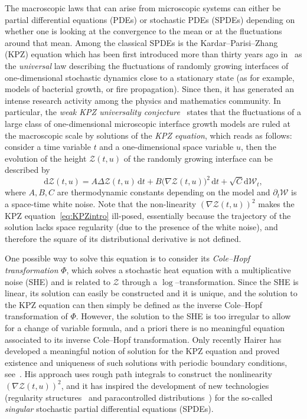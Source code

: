 \documentclass[10pt]{amsart}
\theoremstyle{definition}\newtheorem{defi}[theo]{Definition}\newtheorem{rema}[theo]{Remark}\newtheorem{exam}[theo]{Example}\newtheorem{exem}[theo]{Example}\newtheorem{nota}[theo]{Notation}
\newcommand{\mc}[1]{{\mathcal #1}}
\renewcommand{\mc}[1]{{\mathcal #1}}
\newcommand*{\dd}{\mathrm{d}}
\newcommand*{\dt}{\dd t}
\begin{document}
The macroscopic laws that can arise from microscopic systems can either be partial differential equations (PDEs) or stochastic PDEs (SPDEs) depending on whether one is looking at the convergence to the mean or at the fluctuations around that mean. Among the classical SPDEs is the Kardar--Parisi--Zhang (KPZ) equation which has been first introduced more than thirty years ago in~\cite{KPZ} as the \emph{universal} law describing the fluctuations of randomly growing interfaces of one-dimensional stochastic dynamics close to a stationary state (as for example, models of bacterial growth, or fire propagation). Since then, it has generated an intense research activity among the physics and mathematics community. In particular, the \emph{weak KPZ universality conjecture}~\cite{Corwin12, QuaS, Sp16} states that the fluctuations of a large class of one-dimensional microscopic interface growth models are ruled at the macroscopic scale by solutions of the \emph{KPZ equation}, which reads as follows: consider a time variable $t$ and a one-dimensional space variable $u$, then the evolution of the height $\mc Z(t,u)$ of the randomly growing interface can be described by
\begin{equation}
\dd\mc Z(t,u) = A \Delta \mc Z(t,u)\,\dt + B \big(\nabla \mc Z(t,u)\big)^2 \,\dt + \sqrt C \dd \mc W_t, \label{eq:KPZintro}
\end{equation}
where $A,B,C$ are thermodynamic constants depending on the model and $\partial_t\mc W$ is a space-time white noise. Note that the non-linearity $(\nabla \mc Z(t,u))^2$ makes the KPZ equation~\eqref{eq:KPZintro} ill-posed, essentially because the trajectory of the solution lacks space regularity (due to the presence of the white noise), and therefore the square of its distributional derivative is not defined.

One possible way to solve this equation is to consider its \emph{Cole--Hopf transformation} $\Phi$, which solves a stochastic heat equation with a multiplicative noise (SHE) and is related to $\mc Z$ through a $\log$--transformation. Since the SHE is linear, its solution can easily be constructed and it is unique, and the solution to the KPZ equation can then simply be defined as the inverse Cole--Hopf transformation of $\Phi$. However, the solution to the SHE is too irregular to allow for a change of variable formula, and a priori there is no meaningful equation associated to its inverse Cole--Hopf transformation. Only recently Hairer has developed a meaningful notion of solution for the KPZ equation and proved existence and uniqueness of such solutions with periodic boundary conditions, see~\cite{Hairer2013}. His approach uses rough path integrals to construct the nonlinearity $(\nabla \mc Z(t,u))^2$, and it has inspired the development of new technologies (regularity structures~\cite{Hairer2014} and paracontrolled distributions~\cite{Gubinelli2015Paracontrolled}) for the so-called \emph{singular} stochastic partial differential equations (SPDEs).
\end{document}
